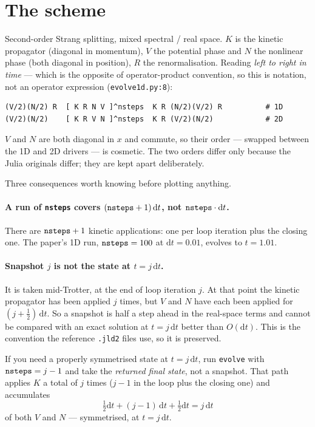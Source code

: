 \documentclass[11pt,a4paper]{article}
\newcommand{\code}[1]{\texttt{#1}}
\newcommand{\dd}{\mathrm{d}}
\begin{document}
\section{The scheme}
\label{sec:scheme}

Second-order Strang splitting, mixed spectral / real space. $K$ is the kinetic
propagator (diagonal in momentum), $V$ the potential phase and $N$ the nonlinear
phase (both diagonal in position), $R$ the renormalisation. Reading \emph{left to
right in time} --- which is the opposite of operator-product convention, so this is
notation, not an operator expression (\code{evolve1d.py:8}):

\begin{lstlisting}
(V/2)(N/2) R  [ K R N V ]^nsteps  K R (N/2)(V/2) R          # 1D
(V/2)(N/2)    [ K R V N ]^nsteps  K R (V/2)(N/2)            # 2D
\end{lstlisting}

$V$ and $N$ are both diagonal in $x$ and commute, so their order --- swapped between
the 1D and 2D drivers --- is cosmetic. The two orders differ only because the Julia
originals differ; they are kept apart deliberately.

Three consequences worth knowing before plotting anything.

\paragraph{A run of \code{nsteps} covers $(\text{\code{nsteps}}+1)\,\dd t$, not
$\text{\code{nsteps}}\cdot \dd t$.}
There are $\text{\code{nsteps}}+1$ kinetic applications: one per loop iteration plus
the closing one. The paper's 1D run, $\text{\code{nsteps}} = 100$ at
$\dd t = 0.01$, evolves to $t = 1.01$.

\paragraph{Snapshot $j$ is not the state at $t = j\,\dd t$.}
It is taken mid-Trotter, at the end of loop iteration $j$. At that point the kinetic
propagator has been applied $j$ times, but $V$ and $N$ have each been applied for
$(j + \tfrac{1}{2})\,\dd t$. So a snapshot is half a step ahead in the real-space
terms and cannot be compared with an exact solution at $t = j\,\dd t$ better than
$O(\dd t)$. This is the convention the reference \code{.jld2} files use, so it is
preserved.

If you need a properly symmetrised state at $t = j\,\dd t$, run \code{evolve} with
$\text{\code{nsteps}} = j-1$ and take the \emph{returned final state}, not a
snapshot. That path applies $K$ a total of $j$ times ($j-1$ in the loop plus the
closing one) and accumulates
\begin{equation*}
  \tfrac{1}{2}\dd t + (j-1)\,\dd t + \tfrac{1}{2}\dd t = j\,\dd t
\end{equation*}
of both $V$ and $N$ --- symmetrised, at $t = j\,\dd t$.
\end{document}
